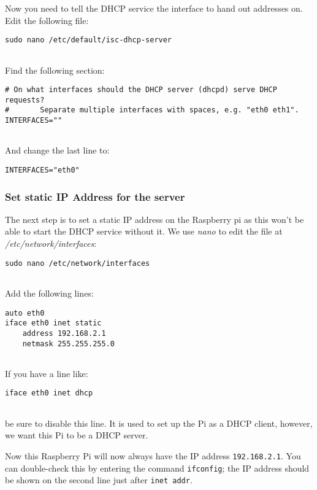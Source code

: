 Now you need to tell the DHCP service the interface to hand out
addresses on. Edit the following file:

\begin{lstlisting}
sudo nano /etc/default/isc-dhcp-server
    
\end{lstlisting}

Find the following section:

\begin{lstlisting}
# On what interfaces should the DHCP server (dhcpd) serve DHCP requests?
#       Separate multiple interfaces with spaces, e.g. "eth0 eth1".
INTERFACES=""
    
\end{lstlisting}

And change the last line to:

\begin{lstlisting}
INTERFACES="eth0"
\end{lstlisting}

\subsubsection{Set static IP Address for the server}

The next step is to set a static IP address on the Raspberry pi as this
won't be able to start the DHCP service without it. We use \emph{nano}
to edit the file at \emph{/etc/network/interfaces}:

\begin{lstlisting}
sudo nano /etc/network/interfaces
    
\end{lstlisting}

Add the following lines:

\begin{lstlisting}
auto eth0
iface eth0 inet static
    address 192.168.2.1
    netmask 255.255.255.0
        
\end{lstlisting}

If you have a line like:

\begin{lstlisting}
iface eth0 inet dhcp
    
\end{lstlisting}

be sure to disable this line. It is used to set up the Pi as a DHCP
client, however, we want this Pi to be a DHCP server.

Now this Raspberry Pi will now always have the IP address
\texttt{192.168.2.1}. You can double-check this by entering the command
\texttt{ifconfig}; the IP address should be shown on the second line
just after \texttt{inet\ addr}.

